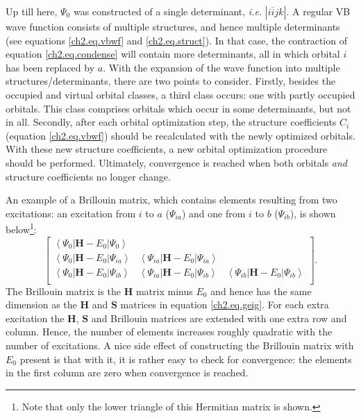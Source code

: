 Up till here, $\Psi_0$ was constructed of a single determinant, \textit{i.e.} $|i\overline{i}jk|$. A regular VB wave function consists of multiple structures, and hence multiple determinants (see equations \ref{ch2.eq.vbwf} and \ref{ch2.eq.struct}). In that case, the contraction of equation \ref{ch2.eq.condense} will contain more determinants, all in which orbital $i$ has been replaced by $a$. With the expansion of the wave function into multiple structures/determinants, there are two points to consider. Firstly, besides the occupied and virtual orbital classes, a third class occurs: one with partly occupied orbitals. This class comprises orbitals which occur in some determinants, but not in all. Secondly, after each orbital optimization step, the structure coefficients $C_i$ (equation \ref{ch2.eq.vbwf}) should be recalculated with the newly optimized orbitals. With these new structure coefficients, a new orbital optimization procedure should be performed. Ultimately, convergence is reached when both orbitals \textit{and} structure coefficients no longer change.

An example of a Brillouin matrix, which contains elements resulting from two excitations: an excitation from $i$ to $a$ ($\Psi_{ia}$) and one from $i$ to $b$ ($\Psi_{ib}$), is shown below\footnote{Note that only the lower triangle of this Hermitian matrix is shown.}:
\begin{equation}
\left[\begin{array}{ccc}
\left< \Psi_{0} | \mathbf{H}-E_0 | \Psi_{0} \right> & & \\
\left< \Psi_{0} | \mathbf{H}-E_0 | \Psi_{ia} \right> & \left< \Psi_{ia} | \mathbf{H}-E_0 | \Psi_{ia} \right> &\\
\left< \Psi_{0} | \mathbf{H}-E_0 | \Psi_{ib} \right> & \left< \Psi_{ia} | \mathbf{H}-E_0 | \Psi_{ib} \right> & \left< \Psi_{ib} | \mathbf{H}-E_0 | \Psi_{ib} \right> \\
\end{array}\right].
\label{ch2.eq.hamilt}
\end{equation}
The Brillouin matrix is the $\mathbf{H}$ matrix minus $E_0$ \cite{koos1} and hence has the same dimension as the $\mathbf{H}$ and $\mathbf{S}$ matrices in equation \ref{ch2.eq.geig}. For each extra excitation the $\mathbf{H}$, $\mathbf{S}$ and Brillouin matrices are extended with one extra row and column. Hence, the number of elements increases roughly quadratic with the number of excitations. A nice side effect of constructing the Brillouin matrix with $E_0$ present is that with it, it is rather easy to check for convergence: the elements in the first column are zero when convergence is reached.

